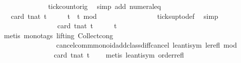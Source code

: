 \begin{isabellebody}
\ \ \ \ \ \ \ \ \ \ \ \ \isamarkupfalse%
\ tick{\isacharunderscore}count{\isacharunderscore}orig\ \isamarkupfalse%
\ {\isacharparenleft}simp\ add{\isacharcolon}\ numeral{\isacharunderscore}{}{\isacharunderscore}eq{\isacharunderscore}{}{\isacharparenright}\isanewline
\ \ \ \ \ \ \ \ \ \ \isamarkupfalse%
\ \isamarkupfalse%
\ {\isacartoucheopen}{\isachardot}{\isachardot}{\isachardot}\ {\isacharequal}\ card\ {\isacharbraceleft}t{\isacharcolon}{\isacharcolon}nat{\isachardot}\ t\ {\isasymle}\ {}\ {\isasymand}\ {}\ {\isasymle}\ t\ {\isasymand}\ {\isacharparenleft}t{\isacharminus}{}{\isacharparenright}\ mod\ {}\ {\isacharequal}\ {}{\isacharbraceright}{\isacartoucheclose}\isanewline
\ \ \ \ \ \ \ \ \ \ \ \ \isamarkupfalse%
\ ticks{\isacharunderscore}up{\isacharunderscore}to{\isacharunderscore}def\ \isamarkupfalse%
\ simp\isanewline
\ \ \ \ \ \ \ \ \ \ \isamarkupfalse%
\ \isamarkupfalse%
\ {\isacartoucheopen}{\isachardot}{\isachardot}{\isachardot}\ {\isasymle}\ \ card\ {\isacharbraceleft}t{\isacharcolon}{\isacharcolon}nat{\isachardot}\ t\ {\isasymle}\ {}\ {\isasymand}\ {}\ {\isasymle}\ t{\isacharbraceright}{\isacartoucheclose}\isanewline
\ \ \ \ \ \ \ \ \ \ \ \ \isamarkupfalse%
\ {\isacharparenleft}metis\ {\isacharparenleft}mono{\isacharunderscore}tags{\isacharcomma}\ lifting{\isacharparenright}\ Collect{\isacharunderscore}cong\isanewline
\ \ \ \ \ \ \ \ \ \ \ \ \ \ \ \ cancel{\isacharunderscore}comm{\isacharunderscore}monoid{\isacharunderscore}add{\isacharunderscore}class{\isachardot}diff{\isacharunderscore}cancel\ le{\isacharunderscore}antisym\ le{\isacharunderscore}refl\ mod{\isacharunderscore}{}{\isacharparenright}\isanewline
\ \ \ \ \ \ \ \ \ \ \isamarkupfalse%
\ \isamarkupfalse%
\ {\isacartoucheopen}{\isachardot}{\isachardot}{\isachardot}\ {\isacharequal}\ card\ {\isacharbraceleft}t{\isacharcolon}{\isacharcolon}nat{\isachardot}\ t\ {\isacharequal}\ {}{\isacharbraceright}{\isacartoucheclose}\ \isamarkupfalse%
\ {\isacharparenleft}metis\ le{\isacharunderscore}antisym\ order{\isacharunderscore}refl{\isacharparenright}\isanewline
\ \ \ \ \ \ \ \ \ \ \isamarkupfalse%
\ \isamarkupfalse%
\ {\isacartoucheopen}{\isachardot}{\isachardot}{\isachardot}\ {\isacharequal}\ {}{\isacartoucheclose}\ \isamarkupfalse%

\end{isabellebody}
